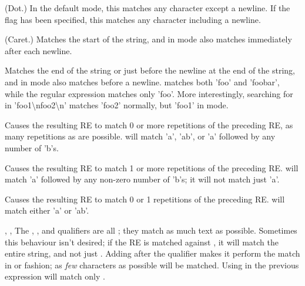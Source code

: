 \begin{list}{}{\leftmargin 0.7in }

\item[\character{.}] (Dot.)  In the default mode, this matches any
character except a newline.  If the  flag has been
specified, this matches any character including a newline.

\item[\character{\textasciicircum}] (Caret.)  Matches the start of the
string, and in  mode also matches immediately
after each newline.

\item[\character{\$}] Matches the end of the string or just before the
newline at the end of the string, and in  mode
also matches before a newline.   matches both 'foo' and
'foobar', while the regular expression  matches only
'foo'.  More interestingly, searching for  in
'foo1\textbackslash nfoo2\textbackslash n' matches 'foo2' normally,
but 'foo1' in  mode.

\item[\character{*}] Causes the resulting RE to
match 0 or more repetitions of the preceding RE, as many repetitions
as are possible.   will
match 'a', 'ab', or 'a' followed by any number of 'b's.

\item[\character{+}] Causes the
resulting RE to match 1 or more repetitions of the preceding RE.
 will match 'a' followed by any non-zero number of 'b's; it
will not match just 'a'.

\item[\character{?}] Causes the resulting RE to
match 0 or 1 repetitions of the preceding RE.   will
match either 'a' or 'ab'.

\item[\code{*?}, \code{+?}, \code{??}] The \character{*},
\character{+}, and  qualifiers are all ; they
match as much text as possible.  Sometimes this behaviour isn't
desired; if the RE  is matched against
, it will match the entire string, and not just
.  Adding  after the qualifier makes it
perform the match in  or  fashion; as
\emph{few} characters as possible will be matched.  Using 
in the previous expression will match only .


\end{list}
